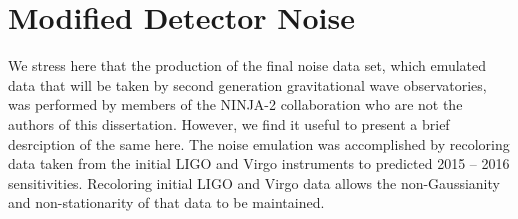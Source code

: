 \section{Modified Detector Noise}
\label{sec:noise}

We stress here that the production of the final noise data set, which emulated data
that will be taken by second generation gravitational wave observatories, 
was performed by members of the NINJA-2 collaboration who are not the authors 
of this dissertation.  
However, we find it useful to present a brief desrciption of the same here.
The noise emulation 
was accomplished by recoloring data taken from the initial LIGO and Virgo 
instruments to predicted 2015 -- 2016 sensitivities. Recoloring initial LIGO 
and 
Virgo data allows the non-Gaussianity and non-stationarity of that data to be 
maintained.

